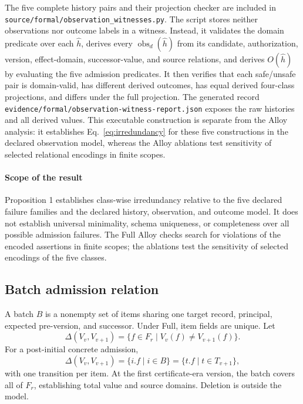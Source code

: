 The five complete history pairs and their projection checker are included in \texttt{source/formal/observation\_witnesses.py}. The script stores neither observations nor outcome labels in a witness. Instead, it validates the domain predicate over each $\widehat h$, derives every $\operatorname{obs}_d(\widehat h)$ from its candidate, authorization, version, effect-domain, successor-value, and source relations, and derives $O(\widehat h)$ by evaluating the five admission predicates. It then verifies that each safe/unsafe pair is domain-valid, has different derived outcomes, has equal derived four-class projections, and differs under the full projection. The generated record \texttt{evidence/formal/observation-witness-report.json} exposes the raw histories and all derived values. This executable construction is separate from the Alloy analysis: it establishes Eq.~\eqref{eq:irredundancy} for these five constructions in the declared observation model, whereas the Alloy ablations test sensitivity of selected relational encodings in finite scopes.

\paragraph{Scope of the result}
Proposition 1 establishes class-wise irredundancy relative to the five declared failure families and the declared history, observation, and outcome model. It does not establish universal minimality, schema uniqueness, or completeness over all possible admission failures. The Full Alloy checks search for violations of the encoded assertions in finite scopes; the ablations test the sensitivity of selected encodings of the five classes.

\subsection{Batch admission relation}

A batch $B$ is a nonempty set of items sharing one target record, principal, expected pre-version, and successor. Under Full, item fields are unique. Let
\begin{equation}
\Delta(V_v,V_{v+1})=\{f\in F_r\mid V_v(f)\neq V_{v+1}(f)\}.
\end{equation}
For a post-initial concrete admission,
\begin{equation}
\Delta(V_v,V_{v+1})=\{i.f\mid i\in B\}=\{t.f\mid t\in T_{v+1}\},
\label{eq:changed-fields}
\end{equation}
with one transition per item. At the first certificate-era version, the batch covers all of $F_r$, establishing total value and source domains. Deletion is outside the model.

